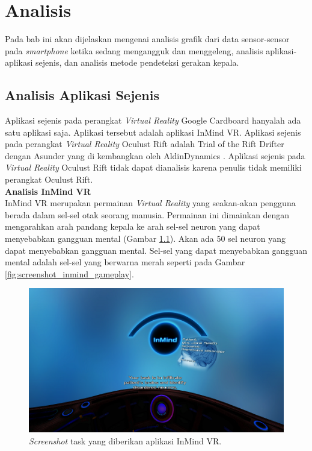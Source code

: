 \chapter{Analisis}
\label{chap:analisis}

Pada bab ini akan dijelaskan mengenai analisis grafik dari data sensor-sensor pada \textit{smartphone} ketika sedang mengangguk dan menggeleng, analisis aplikasi-aplikasi sejenis, dan analisis metode pendeteksi gerakan kepala. 

\section{Analisis Aplikasi Sejenis}
\label{sec:analisis_aplikasi_sejenis}

Aplikasi sejenis pada perangkat \textit{Virtual Reality} Google Cardboard hanyalah ada satu aplikasi saja. Aplikasi tersebut adalah aplikasi InMind VR. Aplikasi sejenis pada perangkat \textit{Virtual Reality} Oculust Rift adalah Trial of the Rift Drifter dengan Asunder yang di kembangkan oleh AldinDynamics \cite{aldin_dynamics}. Aplikasi sejenis pada \textit{Virtual Reality} Oculust Rift tidak dapat dianalisis karena penulis tidak memiliki perangkat Oculust Rift. \\

\textbf{Analisis InMind VR}\\

InMind VR merupakan permainan \textit{Virtual Reality} yang seakan-akan pengguna berada dalam sel-sel otak seorang manusia. Permainan ini dimainkan dengan mengarahkan arah pandang kepala ke arah sel-sel neuron yang dapat menyebabkan gangguan mental (Gambar \ref{fig:screenshot_inmind_task}). Akan ada 50 sel neuron yang dapat menyebabkan gangguan mental. Sel-sel yang dapat menyebabkan gangguan mental adalah sel-sel yang berwarna merah seperti pada Gambar \ref{fig:screenshot_inmind_gameplay}.

\begin{figure}[htbp]
\centering
\includegraphics[scale=0.6]{Gambar/screenshot-inmind-task.png}
\caption{\textit{Screenshot} task yang diberikan aplikasi InMind VR.}
\label{fig:screenshot_inmind_task}
\end{figure}

